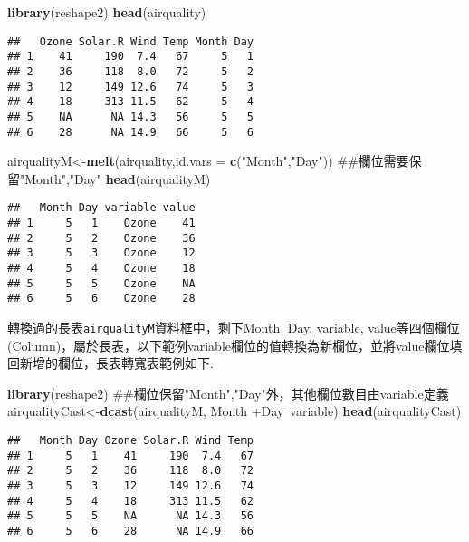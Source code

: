 \documentclass[]{book}
\newenvironment{Shaded}{\begin{snugshade}}{\end{snugshade}}
\newcommand{\KeywordTok}[1]{\textcolor[rgb]{0.13,0.29,0.53}{\textbf{{#1}}}}
\newcommand{\DataTypeTok}[1]{\textcolor[rgb]{0.13,0.29,0.53}{{#1}}}
\newcommand{\StringTok}[1]{\textcolor[rgb]{0.31,0.60,0.02}{{#1}}}
\newcommand{\NormalTok}[1]{{#1}}
\begin{document}
\begin{Shaded}
\begin{Highlighting}[]
\KeywordTok{library}\NormalTok{(reshape2)}
\KeywordTok{head}\NormalTok{(airquality)}
\end{Highlighting}
\end{Shaded}

\begin{verbatim}
##   Ozone Solar.R Wind Temp Month Day
## 1    41     190  7.4   67     5   1
## 2    36     118  8.0   72     5   2
## 3    12     149 12.6   74     5   3
## 4    18     313 11.5   62     5   4
## 5    NA      NA 14.3   56     5   5
## 6    28      NA 14.9   66     5   6
\end{verbatim}

\begin{Shaded}
\begin{Highlighting}[]
\NormalTok{airqualityM<-}\KeywordTok{melt}\NormalTok{(airquality,}\DataTypeTok{id.vars =} \KeywordTok{c}\NormalTok{(}\StringTok{"Month"}\NormalTok{,}\StringTok{"Day"}\NormalTok{)) ##欄位需要保留"Month","Day"}
\KeywordTok{head}\NormalTok{(airqualityM)}
\end{Highlighting}
\end{Shaded}

\begin{verbatim}
##   Month Day variable value
## 1     5   1    Ozone    41
## 2     5   2    Ozone    36
## 3     5   3    Ozone    12
## 4     5   4    Ozone    18
## 5     5   5    Ozone    NA
## 6     5   6    Ozone    28
\end{verbatim}

轉換過的長表\texttt{airqualityM}資料框中，剩下Month, Day, variable,
value等四個欄位
(Column)，屬於長表，以下範例variable欄位的值轉換為新欄位，並將value欄位填回新增的欄位，長表轉寬表範例如下:

\begin{Shaded}
\begin{Highlighting}[]
\KeywordTok{library}\NormalTok{(reshape2)}
\NormalTok{##欄位保留"Month","Day"外，其他欄位數目由variable定義}
\NormalTok{airqualityCast<-}\KeywordTok{dcast}\NormalTok{(airqualityM, Month +Day~variable) }
\KeywordTok{head}\NormalTok{(airqualityCast)}
\end{Highlighting}
\end{Shaded}

\begin{verbatim}
##   Month Day Ozone Solar.R Wind Temp
## 1     5   1    41     190  7.4   67
## 2     5   2    36     118  8.0   72
## 3     5   3    12     149 12.6   74
## 4     5   4    18     313 11.5   62
## 5     5   5    NA      NA 14.3   56
## 6     5   6    28      NA 14.9   66
\end{verbatim}
\end{document}
